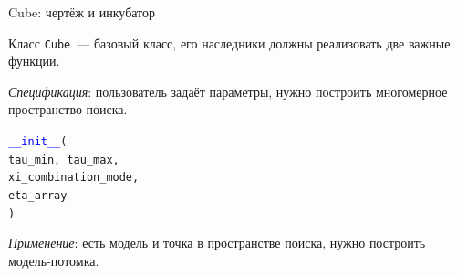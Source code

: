 \begin{frame}[t]{Cube: чертёж и инкубатор}

Класс \texttt{Cube}~--- базовый класс, его наследники должны реализовать две важные функции.

\textit{Спецификация}: пользователь задаёт параметры, нужно построить многомерное пространство поиска.

\begin{minipage}{0.39\textwidth}
{\small \texttt{\textcolor{blue}{\_\_init\_\_}(\\
\hphantom{\ \ \ \ }tau\_min,\ tau\_max,\\ 
\hphantom{\ \ \ \ }xi\_combination\_mode,\\
\hphantom{\ \ \ \ }eta\_array\\
)}}
\end{minipage}
\begin{minipage}{0.05\textwidth}
\scalebox{2}{$\rightarrow$}
\end{minipage}
\begin{minipage}{0.45\textwidth}
\end{minipage}
  

\textit{Применение}: есть модель и точка в пространстве поиска, нужно построить модель-потомка.


\end{frame}

